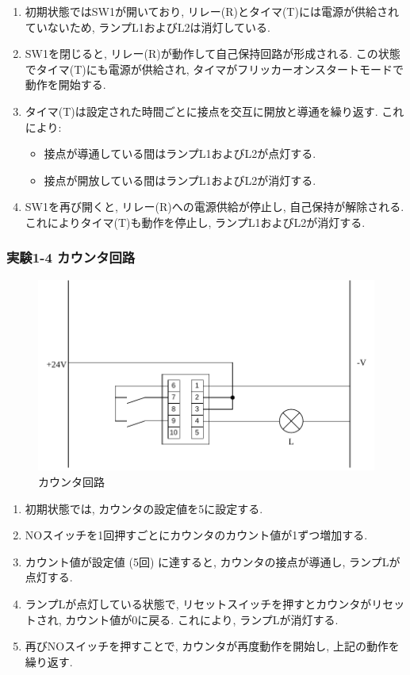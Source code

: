 \begin{enumerate}
  \item 初期状態ではSW1が開いており, リレー(R)とタイマ(T)には電源が供給されていないため, ランプL1およびL2は消灯している.
  \item SW1を閉じると, リレー(R)が動作して自己保持回路が形成される. この状態でタイマ(T)にも電源が供給され, タイマがフリッカーオンスタートモードで動作を開始する.
  \item タイマ(T)は設定された時間ごとに接点を交互に開放と導通を繰り返す. これにより:
        \begin{itemize}
          \item 接点が導通している間はランプL1およびL2が点灯する.
          \item 接点が開放している間はランプL1およびL2が消灯する.
        \end{itemize}
  \item SW1を再び開くと, リレー(R)への電源供給が停止し, 自己保持が解除される. これによりタイマ(T)も動作を停止し, ランプL1およびL2が消灯する.
\end{enumerate}

\subsubsection{実験1-4 カウンタ回路}

\begin{figure}[H]
  \centering
  \includegraphics[scale=0.5]{sozai/3.pdf}
  \caption{カウンタ回路}
\end{figure}

\begin{enumerate}
  \item 初期状態では, カウンタの設定値を5に設定する.
  \item NOスイッチを1回押すごとにカウンタのカウント値が1ずつ増加する.
  \item カウント値が設定値 (5回) に達すると, カウンタの接点が導通し, ランプLが点灯する.
  \item ランプLが点灯している状態で, リセットスイッチを押すとカウンタがリセットされ, カウント値が0に戻る. これにより, ランプLが消灯する.
  \item 再びNOスイッチを押すことで, カウンタが再度動作を開始し, 上記の動作を繰り返す.
\end{enumerate}


